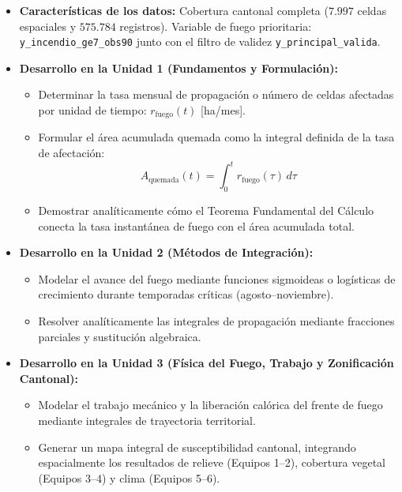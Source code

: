 \documentclass[11pt,a4paper]{article}
\begin{document}
\begin{itemize}[leftmargin=*,itemsep=1.5pt]
  \item \textbf{Características de los datos:} Cobertura cantonal completa ($7.997$ celdas espaciales y $575.784$ registros). Variable de fuego prioritaria: \texttt{y\_incendio\_ge7\_obs90} junto con el filtro de validez \texttt{y\_principal\_valida}.
  \item \textbf{Desarrollo en la Unidad 1 (Fundamentos y Formulación):}
  \begin{itemize}
    \item Determinar la tasa mensual de propagación o número de celdas afectadas por unidad de tiempo: $r_{\text{fuego}}(t)$ [ha/mes].
    \item Formular el área acumulada quemada como la integral definida de la tasa de afectación:
    \begin{equation*}
      A_{\text{quemada}}(t) = \int_{0}^{t} r_{\text{fuego}}(\tau)\,d\tau
    \end{equation*}
    \item Demostrar analíticamente cómo el Teorema Fundamental del Cálculo conecta la tasa instantánea de fuego con el área acumulada total.
  \end{itemize}
  \item \textbf{Desarrollo en la Unidad 2 (Métodos de Integración):}
  \begin{itemize}
    \item Modelar el avance del fuego mediante funciones sigmoideas o logísticas de crecimiento durante temporadas críticas (agosto--noviembre).
    \item Resolver analíticamente las integrales de propagación mediante fracciones parciales y sustitución algebraica.
  \end{itemize}
  \item \textbf{Desarrollo en la Unidad 3 (Física del Fuego, Trabajo y Zonificación Cantonal):}
  \begin{itemize}
    \item Modelar el trabajo mecánico y la liberación calórica del frente de fuego mediante integrales de trayectoria territorial.
    \item Generar un mapa integral de susceptibilidad cantonal, integrando espacialmente los resultados de relieve (Equipos 1--2), cobertura vegetal (Equipos 3--4) y clima (Equipos 5--6).
  \end{itemize}
\end{itemize}
\end{document}
